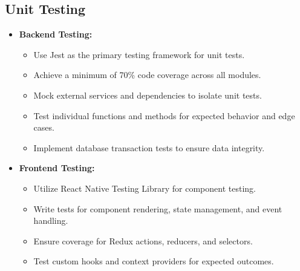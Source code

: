 \subsection{Unit Testing}
\begin{itemize}[leftmargin=*]
    \item \textbf{Backend Testing:}
    \begin{itemize}
        \item Use Jest as the primary testing framework for unit tests.
        \item Achieve a minimum of 70\% code coverage across all modules.
        \item Mock external services and dependencies to isolate unit tests.
        \item Test individual functions and methods for expected behavior and edge cases.
        \item Implement database transaction tests to ensure data integrity.
    \end{itemize}
    
    \item \textbf{Frontend Testing:}
    \begin{itemize}
        \item Utilize React Native Testing Library for component testing.
        \item Write tests for component rendering, state management, and event handling.
        \item Ensure coverage for Redux actions, reducers, and selectors.
        \item Test custom hooks and context providers for expected outcomes.
    \end{itemize}
\end{itemize}

